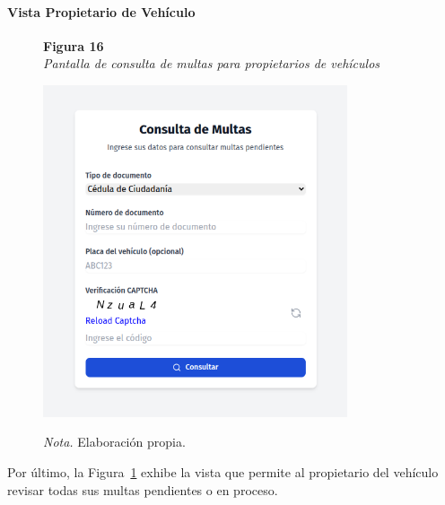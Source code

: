  \paragraph{Vista Propietario de Vehículo}
 \begin{figure}[htbp]
    \begin{flushleft}
        \textbf{Figura 16}\\[2em]
        \textit{Pantalla de consulta de multas para propietarios de vehículos}
    \end{flushleft}
    \vspace{1em}
    \centering
    \includegraphics[width=0.8\textwidth]{Images/UI5.png}
    \vspace{2em}
    \begin{flushleft}
        \textit{Nota.} Elaboración propia.
    \end{flushleft}
    \label{fig:consulta_multas_propietario}
\end{figure}
Por último, la Figura~\ref{fig:consulta_multas_propietario} exhibe la vista que permite al propietario del vehículo revisar todas sus multas pendientes o en proceso. 